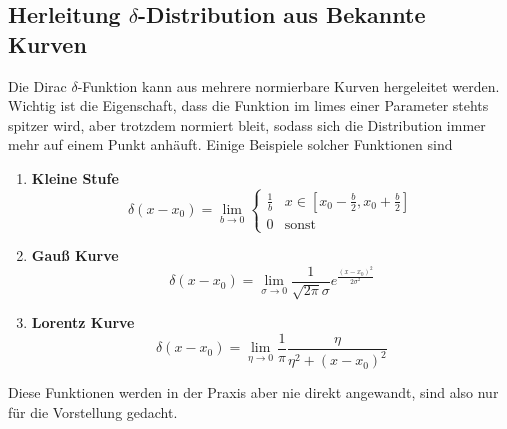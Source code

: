 \subsection{Herleitung $\delta$-Distribution aus Bekannte Kurven}%
\label{sub:herleitung-delta-distribution}
Die Dirac $\delta$-Funktion kann aus mehrere normierbare Kurven hergeleitet
werden. Wichtig ist die Eigenschaft, dass die Funktion im limes einer
Parameter stehts spitzer wird, aber trotzdem normiert bleit, sodass sich
die Distribution immer mehr auf einem Punkt anhäuft. 
Einige Beispiele solcher Funktionen sind
\begin{enumerate}
  \item \textbf{Kleine Stufe}
    \begin{equation}
      \delta(x - x_0) = \lim_{b \to 0} 
      \begin{cases}
        \frac{1}{b} &x\in[x_0 - \frac{b}{2}, x_0 + \frac{b}{2}] \\
        0 & \textrm{sonst}
      \end{cases}
    \end{equation}
  \item \textbf{Gauß Kurve} 
    \begin{equation}
      \delta(x - x_0) = \lim_{\sigma \to 0} 
      \frac{1}{\sqrt{2\pi}\sigma} e^{\frac{(x-x_0)^2}{2\sigma^2}}
    \end{equation}
  \item \textbf{Lorentz Kurve}
    \begin{equation}
      \delta(x - x_0) = \lim_{\eta \to 0} \frac{1}{\pi} 
      \frac{\eta}{\eta^2 + (x-x_0)^2} 
    \end{equation}
\end{enumerate}
Diese Funktionen werden in der Praxis aber nie direkt angewandt, sind
also nur für die Vorstellung gedacht.

